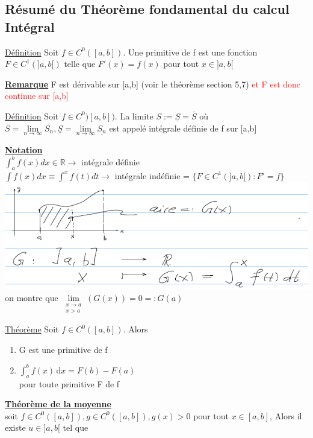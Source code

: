 \documentclass[12pt,a4paper]{article}
\newcommand{\limite}{\lim\limits_}
\newcommand{\llimite}[3]{\limite{\substack{#1 \\ #2}}\left(#3\right)}
\newcommand{\evid}[1]{\textbf{\underline{#1}}}
\newcommand{\ninf}{\ensuremath{n \to \infty}}
\newcommand{\R}{\ensuremath{\mathbb{R}} }
\newcommand{\Theoreme}{\underline{Théorème} }
\newcommand{\Definition}{\underline{Définition} }
\begin{document}
{\subsection*{Résumé du Théorème fondamental du calcul Intégral}
\begin{boite}
	\Definition Soit $f \in C^0 ([a,b])$. Une primitive de f est une fonction $F \in C^1(]a,b[)$ telle que $F'(x) = f(x)$ pour tout $x \in ]a,b[$
\end{boite}
\evid{Remarque} F est dérivable sur [a,b] (voir le théorème section 5,7) \textcolor{red}{et F est donc continue sur [a,b]}
\begin{boite}
	\Definition Soit $f \in C^0)[a,b])$. La limite $S := \underline{S} = \overline{S}$ où $\overline{S} = \limite{\ninf}\overline{S_n}, \underline{S} = \limite{\ninf}\underline{S_n}$ est appelé intégrale définie de f sur [a,b]
\end{boite}
\evid{Notation}\\
$\int_a^b f(x) dx \in \R\to$ intégrale définie\\
$\int f(x) dx \equiv \int^x f(t)dt\to$ intégrale indéfinie = $\{F \in C^1(]a,b[) : F' = f\}$\\
\includegraphics[scale=0.5]{illustrations_analyse/notation_integrale}\\
on montre que $\llimite{x\to a}{x>a}{G(x)} = 0 =: G(a)$
\begin{boite}
	\Theoreme Soit $f \in C^0 ([a,b])$. Alors 
	\begin{enumerate}[label=\roman*)]
		\item G est une primitive de f
		\item $\int_a^b f(x)\, \mathrm dx = F(b) - F(a)$\\
		pour toute primitive F de f
	\end{enumerate}
\end{boite}
\begin{boite}
\evid{Théorème de la moyenne}\\
soit $f\in C^0([a,b]), g\in C^0([a,b]), g(x) > 0$ pour tout $x \in [a,b]$, Alors il existe $u \in ]a,b[$ tel que

\end{boite}}
\end{document}
